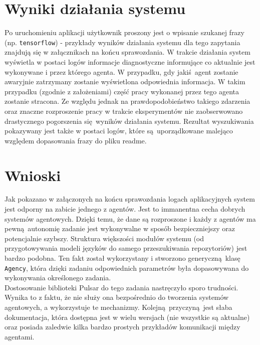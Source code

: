 \documentclass[12pt, oneside, final]{report}
\begin{document}
\section*{Wyniki działania systemu}
Po uruchomieniu aplikacji użytkownik proszony jest o wpisanie szukanej frazy (np. \texttt{tensorflow}) - przykłady wyników działania systemu dla tego zapytania znajdują się w załącznikach na końcu sprawozdania. W trakcie działania system wyświetla w postaci logów informacje diagnostyczne informujące co aktualnie jest wykonywane i przez którego agenta. W przypadku, gdy jakiś agent zostanie awaryjnie zatrzymany zostanie wyświetlona odpowiednia informacja. W takim przypadku (zgodnie z założeniami) część pracy wykonanej przez tego agenta zostanie stracona. Ze względu jednak na prawdopodobieństwo takiego zdarzenia oraz znaczne rozproszenie pracy w trakcie eksperymentów nie zaobserwowano drastycznego pogorszenia się wyników działania systemu. Rezultat wyszukiwania pokazywany jest także w postaci logów, które są uporządkowane malejąco względem dopasowania frazy do pliku readme.

\section*{Wnioski}
Jak pokazano w załączonych na końcu sprawozdania logach aplikacyjnych system jest odporny na zabicie jednego z agentów. Jest to immanentna cecha dobrych systemów agentowych. Dzięki temu, że dane są rozproszone i każdy z agentów ma pewną autonomię zadanie jest wykonywalne w sposób bezpieczniejszy oraz potencjalnie szybszy. Struktura większości modułów systemu (od przygotowywania modeli języków do samego przeszukiwania repozytoriów) jest bardzo podobna. Ten fakt został wykorzystany i stworzono generyczną klasę \texttt{Agency}, która dzięki zadaniu odpowiednich parametrów była dopasowywana do wykonywania określonego zadania.
\\
Dostosowanie biblioteki Pulsar do tego zadania nastręczyło sporo trudności. Wynika to z faktu, że nie służy ona bezpośrednio do tworzenia systemów agentowych, a wykorzystuje te mechanizmy. Kolejną przyczyną jest słaba dokumentacja, która dostępna jest w wielu wersjach (nie wszystkie są aktualne) oraz posiada zaledwie kilka bardzo prostych przykładów komunikacji między agentami.
\end{document}
